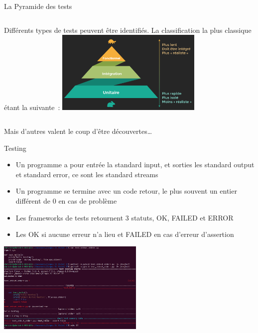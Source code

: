 \documentclass{beamer}
\begin{document}
    \begin{frame}{La Pyramide des tests}
        \begin{columns}
            Différents types de tests peuvent être identifiés.
            La classification la plus classique étant la suivante\footnotemark~:
            \centering
            \includegraphics[width=7cm]{image/classic-test-pyramid}
        \end{columns}
        \bigbreak
        Mais d'autres valent le coup d'être découvertes\ldots

    \end{frame}

    \begin{frame}{Testing}

        \begin{itemize}

            \item Un programme a pour entrée la standard input, et sorties les standard output et standard error, ce sont les standard streams
            \item Un programme se termine avec un code retour, le plus souvent un entier différent de 0 en cas de problème
            \item Les frameworks de tests retournent 3 statuts, OK, FAILED et ERROR
            \item Les OK si aucune erreur n'a lieu et FAILED en cas d'erreur d'assertion

        \end{itemize}

        \bigbreak

        \centering
        \includegraphics[width=7cm]{image/terminal-test-report}

    \end{frame}
\end{document}
